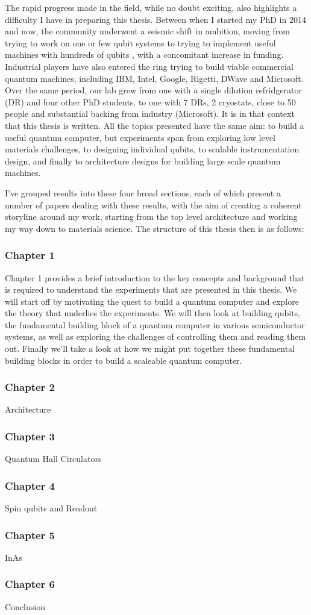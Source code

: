 The rapid progress made in the field, while no doubt exciting, also highlights a difficulty I have in
preparing this thesis. Between when I started my PhD in 2014 and now, the community underwent a seismic
shift in ambition, moving from trying to work on one or few qubit systems \cite{iarpa_mqco} to trying 
to implement useful machines with hundreds of qubits \cite{Monroe440}, with a concomitant increase in
funding. Industrial players have also
entered the ring trying to build viable commercial quantum machines, including IBM, Intel, Google, Rigetti, 
DWave and Microsoft. Over the same period, our lab grew from one with a single dilution refridgerator (DR) 
and four other PhD students, to one with 7 DRs, 2 cryostats, close to 50 people and substantial backing
from industry (Microsoft). It is in that context that this thesis is written. All the topics presented have the
same aim: to build a useful quantum computer, but experiments span from exploring low level materials challenges,
to designing individual qubits, to scalable instrumentation design, and finally to architecture
designs for building large scale quantum machines. 

I've grouped results into these four broad sections, each of which present a number of papers dealing 
with these results, with the aim of creating a coherent storyline around my work, starting from the top
level architecture and working my way down to materials science. The structure of this
thesis then is as follows:

\subsubsection{Chapter 1}
Chapter 1 provides a brief introduction to the key concepts and background that is required to understand
the experiments that are presented in this thesis. We will start off by motivating the quest to build a quantum
computer and explore the theory that underlies the experiments. We will then look at building qubits,
the fundamental building block of a quantum computer in various semiconductor systems, as well as exploring
the challenges of controlling them and reading them out. Finally we'll take a look at how we might put
together these fundamental building blocks in order to build a scaleable quantum computer.

\subsubsection{Chapter 2}
Architecture

\subsubsection{Chapter 3}
Quantum Hall Circulators

\subsubsection{Chapter 4}
Spin qubits and Readout

\subsubsection{Chapter 5}
InAs

\subsubsection{Chapter 6}
Conclusion

